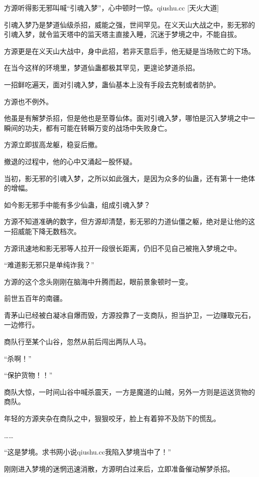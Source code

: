 
\begin{this_body}

方源听得影无邪叫喊“引魂入梦”，心中顿时一惊。qiushu.cc [天火大道]

引魂入梦乃是梦道仙级杀招，威能之强，世间罕见。在义天山大战之中，影无邪的引魂入梦，就令监天塔中的监天塔主直接入睡，沉迷于梦境之中，不能自拔。

方源更是在义天山大战中，身中此招，若非天意后手，他无疑是当场败亡的下场。

在当今这样的环境里，梦道仙蛊都极其罕见，更遑论梦道杀招。

一招鲜吃遍天，面对引魂入梦，蛊仙基本上没有手段去克制或者防护。

方源也不例外。

他虽是有解梦杀招，但是他也是至尊仙体。面对引魂入梦，哪怕是沉入梦境之中一瞬间的功夫，都有可能在转瞬万变的战场中失败身亡。

方源立即拔高龙躯，稳妥后撤。

撤退的过程中，他的心中又涌起一股怀疑。

当初，影无邪的引魂入梦，之所以如此强大，是因为众多的仙蛊，还有第十一绝体的增幅。

如今影无邪手中能有多少仙蛊，组成引魂入梦？

方源不知道准确的数字，但方源却清楚，影无邪的力道仙僵之躯，绝对是让他的这一招威能下降无数档次。

方源讯速地和影无邪等人拉开一段很长距离，仍旧不见自己被拖入梦境之中。

“难道影无邪只是单纯诈我？”

方源的这个念头刚刚在脑海中升腾而起，眼前景象顿时一变。

前世五百年的南疆。

青茅山已经被白凝冰自爆而毁，方源投靠了一支商队，担当护卫，一边赚取元石，一边修行。

商队行至某个山谷，忽然从前后闯出两队人马。

“杀啊！”

“保护货物！！”

商队大惊，一时间山谷中喊杀震天，一方是魔道的山贼，另外一方则是运送货物的商队。

年轻的方源夹杂在商队之中，狠狠咬牙，脸上有着猝不及防下的慌乱。

……

“这是梦境。求书网小说qiushu.cc我陷入梦境当中了！”

刚刚进入梦境的迷惘迅速消散，方源明白过来后，立即准备催动解梦杀招。


\end{this_body}
